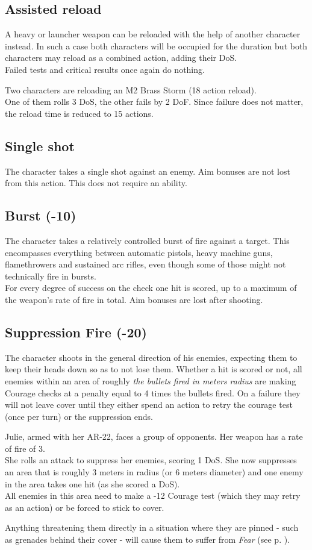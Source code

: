 \subsection*{Assisted reload}
A heavy or launcher weapon can be reloaded with the help of another character instead. In such a case both characters will be occupied for the duration but both characters may reload as a combined action, adding their DoS.
\\%
Failed tests and critical results once again do nothing.
\begin{exampleblock}
	Two characters are reloading an M2 Brass Storm (18 action reload).
	\\%
	One of them rolls 3 DoS, the other fails by 2 DoF.
	Since failure does not matter, the reload time is reduced to 15 actions.
\end{exampleblock}
\subsection*{Single shot}
The character takes a single shot against an enemy.
Aim bonuses are not lost from this action.
This does not require an ability.
\subsection*{Burst (-10)}
The character takes a relatively controlled burst of fire against a target.
This encompasses everything between automatic pistols, heavy machine guns, flamethrowers and sustained arc rifles, even though some of those might not technically fire in bursts.
\\%
For every degree of success on the check one hit is scored,
	up to a maximum of the weapon’s rate of fire in total.
Aim bonuses are lost after shooting.
\subsection*{Suppression Fire (-20)}
The character shoots in the general direction of his enemies, expecting them to keep their heads down so as to not lose them.
Whether a hit is scored or not, all enemies within an area of
	roughly \emph{the bullets fired in meters radius}
	are making Courage checks at a penalty equal to
	4 times the bullets fired.
On a failure they will not leave cover until they either spend an action to retry the courage test (once per turn) or the suppression ends.
\begin{exampleblock}
	Julie, armed with her AR-22, faces a group of opponents.
	Her weapon has a rate of fire of 3.
	\\%
	She rolls an attack to suppress her enemies, scoring 1 DoS.
	She now suppresses an area that is roughly
		3 meters in radius (or 6 meters diameter)
		and one enemy in the area takes one hit (as she scored a DoS).
	\\%
	All enemies in this area need to make a
		-12 Courage test
		(which they may retry as an action)
		or be forced to stick to cover.
\end{exampleblock}
Anything threatening them directly in a situation where they are pinned
	- such as grenades behind their cover -
	will cause them to suffer from \emph{Fear} (see p. \pageref{sec:fear}).
